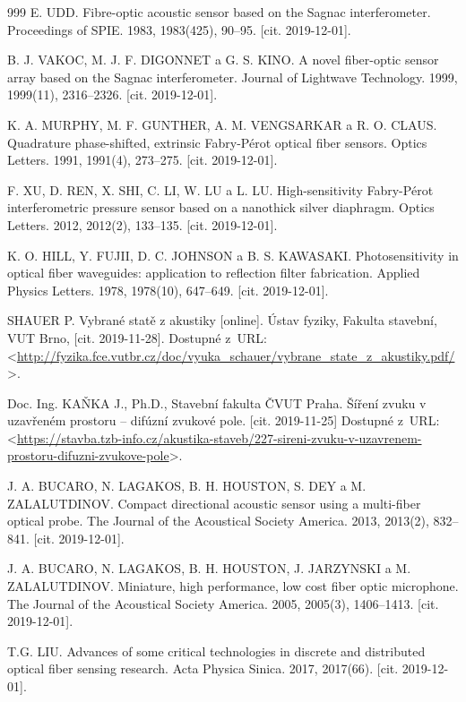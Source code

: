 \begin{thebibliography}{999}
	E. UDD. Fibre-optic acoustic sensor based on the Sagnac interferometer. Proceedings of SPIE. 1983, 1983(425), 90–95. [cit. 2019-12-01].

	B. J. VAKOC, M. J. F. DIGONNET a G. S. KINO. A novel fiber-optic sensor array based on the Sagnac interferometer. Journal of Lightwave Technology. 1999, 1999(11), 2316–2326. [cit. 2019-12-01].

	K. A. MURPHY, M. F. GUNTHER, A. M. VENGSARKAR a R. O. CLAUS. Quadrature phase-shifted, extrinsic Fabry-Pérot optical fiber sensors. Optics Letters. 1991, 1991(4), 273–275. [cit. 2019-12-01].

	F. XU, D. REN, X. SHI, C. LI, W. LU a L. LU. High-sensitivity Fabry-Pérot interferometric pressure sensor based on a nanothick silver diaphragm. Optics Letters. 2012, 2012(2), 133–135. [cit. 2019-12-01].

	K. O. HILL, Y. FUJII, D. C. JOHNSON a B. S. KAWASAKI. Photosensitivity in optical fiber waveguides: application to reflection filter fabrication. Applied Physics Letters. 1978, 1978(10), 647–649. [cit. 2019-12-01].
	
	SHAUER P. Vybrané statě z akustiky [online]. Ústav fyziky, Fakulta stavební, VUT Brno, [cit. 2019-11-28].
	Dostupné z~URL:\\ 
	<\url{http://fyzika.fce.vutbr.cz/doc/vyuka_schauer/vybrane_state_z_akustiky.pdf/}>.
	
Doc. Ing. KAŇKA J., Ph.D., Stavební fakulta ČVUT Praha. Šíření zvuku v uzavřeném prostoru – difúzní zvukové pole. [cit. 2019-11-25] Dostupné z~URL:\\
<\url{https://stavba.tzb-info.cz/akustika-staveb/227-sireni-zvuku-v-uzavrenem-prostoru-difuzni-zvukove-pole}>.
	
	J. A. BUCARO, N. LAGAKOS, B. H. HOUSTON, S. DEY a M. ZALALUTDINOV. Compact directional acoustic sensor using a multi-fiber optical probe. The Journal of the Acoustical Society America. 2013, 2013(2), 832–841. [cit. 2019-12-01].
	
	J. A. BUCARO, N. LAGAKOS, B. H. HOUSTON, J. JARZYNSKI a M. ZALALUTDINOV. Miniature, high performance, low cost fiber optic microphone. The Journal of the Acoustical Society America. 2005, 2005(3), 1406–1413. [cit. 2019-12-01].
	
	T.G. LIU. Advances of some critical technologies in discrete and distributed optical fiber sensing research. Acta Physica Sinica. 2017, 2017(66). [cit. 2019-12-01].
	

\end{thebibliography}
